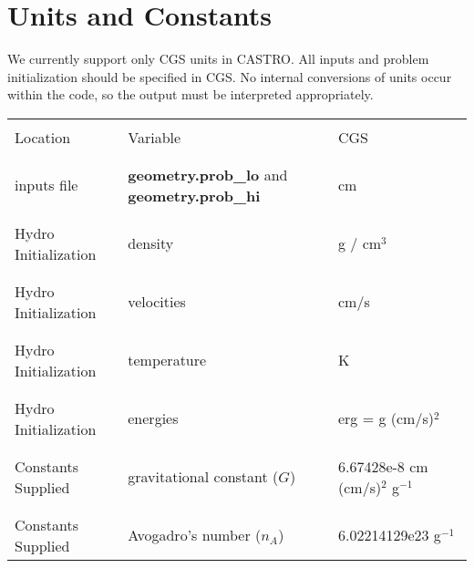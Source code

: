 \section{Units and Constants}

We currently support only CGS units in CASTRO.
All inputs and problem initialization should be specified in CGS.
No internal conversions of units occur within the code, so the output must be interpreted appropriately. \\

\begin{table*}[h]
\begin{scriptsize}
\begin{center}
\begin{tabular}{|l|l|l|} \hline
          & & \\
Location & Variable & CGS \\
          & & \\
\hline
          & & \\
inputs file             & {\bf geometry.prob\_lo} and {\bf geometry.prob\_hi} & {\rm cm}  \\ 
          & & \\ \hline 
          & & \\
Hydro Initialization    & density                                   & g         / cm$^3$   \\  
          & & \\ \hline 
          & & \\
Hydro Initialization    & velocities                                & cm/s    \\ 
          & & \\ \hline 
          & & \\
Hydro Initialization    & temperature                               & K            \\ 
          & & \\ \hline 
          & & \\
Hydro Initialization    & energies                                  & erg = g (cm/s)$^2$   \\       
          & & \\ \hline 
          & & \\
Constants Supplied & gravitational constant ($G$)                   & 6.67428e-8  cm (cm/s)$^2$  g$^{-1}$   \\
          & & \\ \hline 
          & & \\
Constants Supplied & Avogadro's number ($n_A$)                      &  6.02214129e23  g$^{-1}$  \\

\end{tabular}
\end{center}
\end{scriptsize}
\end{table*}
